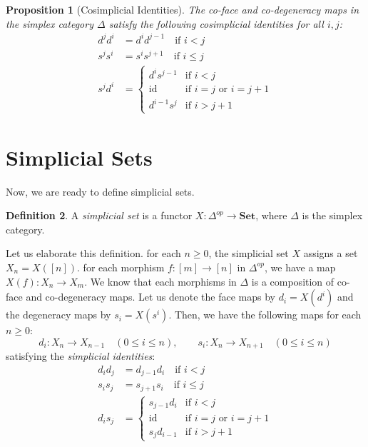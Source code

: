 \documentclass[11pt]{article}
\theoremstyle{definition}
\newtheorem{definition}{Definition}[section]
\theoremstyle{plain}
\newtheorem{proposition}[definition]{Proposition}
\begin{document}
\begin{proposition}[Cosimplicial Identities]
    The co-face and co-degeneracy maps in the simplex category $\Delta$ satisfy the following \emph{cosimplicial identities} for all $i, j$:
    \begin{align*}
        d^j d^i & = d^i d^{j-1} \quad \text{if } i < j      \\
        s^j s^i & = s^{i} s^{j+1} \quad \text{if } i \leq j \\
        s^j d^i & =
        \begin{cases}
            d^i s^{j-1} & \text{if } i < j                     \\
            \mathrm{id} & \text{if } i = j \text{ or } i = j+1 \\
            d^{i-1} s^j & \text{if } i > j+1
        \end{cases}
    \end{align*}
\end{proposition}

\section{Simplicial Sets}
Now, we are ready to define simplicial sets.
\begin{definition}
    A \emph{simplicial set} is a functor $X: \Delta^{op} \to \mathbf{Set}$, where $\Delta$ is the simplex category.
\end{definition}

Let us elaborate this definition. for each $n \geq 0$, the simplicial set $X$ assigns a set $X_n = X([n])$.
for each morphism $f: [m] \to [n]$ in $\Delta^{op}$, we have a map $X(f): X_n \to X_m$.
We know that each morphisms in $\Delta$ is a composition of co-face and co-degeneracy maps. Let us denote the face maps by $d_i=X(d^i)$ and the degeneracy maps by $s_i=X(s^i)$. Then, we have the following maps for each $n \geq 0$:
\[
    d_i : X_n \to X_{n-1} \quad (0 \leq i \leq n), \qquad s_i : X_n \to X_{n+1} \quad (0 \leq i \leq n)
\]
satisfying the \emph{simplicial identities}:
\begin{align*}
    d_i d_j & = d_{j-1} d_i \quad \text{if } i < j    \\
    s_i s_j & = s_{j+1} s_i \quad \text{if } i \leq j \\
    d_i s_j & =
    \begin{cases}
        s_{j-1} d_i & \text{if } i < j                     \\
        \mathrm{id} & \text{if } i = j \text{ or } i = j+1 \\
        s_j d_{i-1} & \text{if } i > j+1
    \end{cases}
\end{align*}
\end{document}
